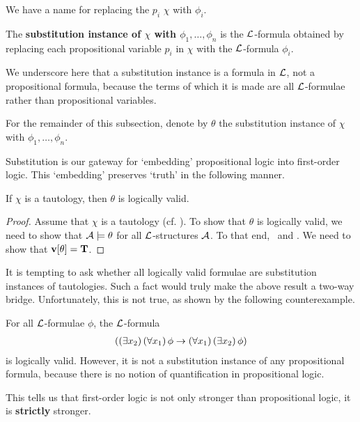 We have a name for replacing the $p_i$ $\chi$ with $\phi_i$.

\begin{boxdefinition}
    The \textbf{substitution instance of $\chi$ with $\phi_1, \ldots, \phi_n$} is the $\mathcal{L}$-formula obtained by replacing each propositional variable $p_i$ in $\chi$ with the $\mathcal{L}$-formula $\phi_i$.
\end{boxdefinition}
\begin{remark}
    We underscore here that a substitution instance is a formula in $\mathcal{L}$, not a propositional formula, because the terms of which it is made are all $\mathcal{L}$-formulae rather than propositional variables.
\end{remark}

For the remainder of this subsection, denote by $\theta$ the substitution instance of $\chi$ with $\phi_1, \ldots, \phi_n$.

Substitution is our gateway for `embedding' propositional logic into first-order logic. This `embedding' preserves `truth' in the following manner.

\begin{boxtheorem}\label{Ch2:Thm:Tauto_Logic_Valid}
    If $\chi$ is a tautology, then $\theta$ is logically valid.
\end{boxtheorem}
\begin{proof}
    Assume that $\chi$ is a tautology (cf. ). To show that $\theta$ is logically valid, we need to show that $\mathcal{A} \models \theta$ for all $\mathcal{L}$-structures $\mathcal{A}$. To that end, \ and \vola. We need to show that $\mathbf{v}\!\left[ \theta \right] = \mathbf{T}$. \sorry
\end{proof}

It is tempting to ask whether all logically valid formulae are substitution instances of tautologies. Such a fact would truly make the above result a two-way bridge. Unfortunately, this is not true, as shown by the following counterexample.

\begin{boxcexample}
    For all $\mathcal{L}$-formulae $\phi$, the $\mathcal{L}$-formula
    \begin{align*}
        \left( \left( \exists x_2 \right)\left( \forall x_1 \right)\phi \to \left( \forall x_1 \right)\left( \exists x_2 \right)\phi \right)
    \end{align*}
    is logically valid. However, it is not a substitution instance of any propositional formula, because there is no notion of quantification in propositional logic.
\end{boxcexample}

This tells us that first-order logic is not only stronger than propositional logic, it is \textbf{strictly} stronger.
